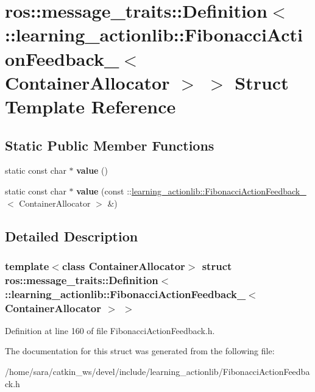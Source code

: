 \hypertarget{structros_1_1message__traits_1_1Definition_3_01_1_1learning__actionlib_1_1FibonacciActionFeedbacd9c932e3e5d8dc8806f1fa6a825a6667}{}\section{ros\+:\+:message\+\_\+traits\+:\+:Definition$<$ \+:\+:learning\+\_\+actionlib\+:\+:Fibonacci\+Action\+Feedback\+\_\+$<$ Container\+Allocator $>$ $>$ Struct Template Reference}
\label{structros_1_1message__traits_1_1Definition_3_01_1_1learning__actionlib_1_1FibonacciActionFeedbacd9c932e3e5d8dc8806f1fa6a825a6667}
\subsection*{Static Public Member Functions}
\begin{DoxyCompactItemize}
\item 
\mbox{\label{structros_1_1message__traits_1_1Definition_3_01_1_1learning__actionlib_1_1FibonacciActionFeedbacd9c932e3e5d8dc8806f1fa6a825a6667_a8423b86e24f4dd7b9e204e3c3d160cfb}} 
static const char $\ast$ {\bfseries value} ()
\item 
\mbox{\label{structros_1_1message__traits_1_1Definition_3_01_1_1learning__actionlib_1_1FibonacciActionFeedbacd9c932e3e5d8dc8806f1fa6a825a6667_a99aeee400d183d15b85ac7815d0892dc}} 
static const char $\ast$ {\bfseries value} (const \+::\hyperlink{structlearning__actionlib_1_1FibonacciActionFeedback__}{learning\+\_\+actionlib\+::\+Fibonacci\+Action\+Feedback\+\_\+}$<$ Container\+Allocator $>$ \&)
\end{DoxyCompactItemize}


\subsection{Detailed Description}
\subsubsection*{template$<$class Container\+Allocator$>$\newline
struct ros\+::message\+\_\+traits\+::\+Definition$<$ \+::learning\+\_\+actionlib\+::\+Fibonacci\+Action\+Feedback\+\_\+$<$ Container\+Allocator $>$ $>$}



Definition at line 160 of file Fibonacci\+Action\+Feedback.\+h.



The documentation for this struct was generated from the following file\+:\begin{DoxyCompactItemize}
\item 
/home/sara/catkin\+\_\+ws/devel/include/learning\+\_\+actionlib/Fibonacci\+Action\+Feedback.\+h\end{DoxyCompactItemize}
